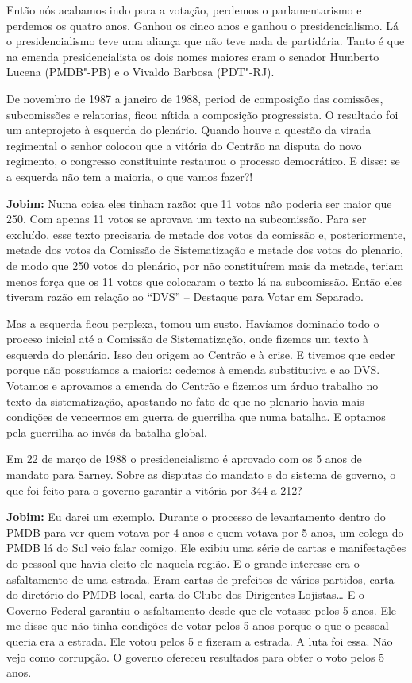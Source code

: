 Então nós acabamos indo para a votação, perdemos o parlamentarismo e
perdemos os quatro anos. Ganhou os cinco anos e ganhou o
presidencialismo. Lá o presidencialismo teve uma aliança que não teve
nada de partidária. Tanto é que na emenda presidencialista os dois nomes
maiores eram o senador Humberto Lucena (PMDB"-PB) e o Vivaldo Barbosa
(PDT"-RJ).

De novembro de 1987 a janeiro de 1988, period de composição das
comissões, subcomissões e relatorias, ficou nítida a composição
progressista. O resultado foi um anteprojeto à esquerda do plenário.
Quando houve a questão da virada regimental o senhor colocou que a
vitória do Centrão na disputa do novo regimento, o congresso
constituinte restaurou o processo democrático. E disse: se a esquerda
não tem a maioria, o que vamos fazer?!

\textbf{Jobim:} Numa coisa eles tinham razão: que 11 votos não poderia
ser maior que 250. Com apenas 11 votos se aprovava um texto na
subcomissão. Para ser excluído, esse texto precisaria de metade dos
votos da comissão e, posteriormente, metade dos votos da Comissão de
Sistematização e metade dos votos do plenario, de modo que 250 votos do
plenário, por não constituírem mais da metade, teriam menos força que os
11 votos que colocaram o texto lá na subcomissão. Então eles tiveram
razão em relação ao ``DVS'' -- Destaque para Votar em Separado.

Mas a esquerda ficou perplexa, tomou um susto. Havíamos dominado todo o
proceso inicial até a Comissão de Sistematização, onde fizemos um texto
à esquerda do plenário. Isso deu origem ao Centrão e à crise. E tivemos
que ceder porque não possuíamos a maioria: cedemos à emenda substitutiva
e ao DVS. Votamos e aprovamos a emenda do Centrão e fizemos um árduo
trabalho no texto da sistematização, apostando no fato de que no
plenario havia mais condições de vencermos em guerra de guerrilha que
numa batalha. E optamos pela guerrilha ao invés da batalha global.

Em 22 de março de 1988 o presidencialismo é aprovado com os 5 anos de
mandato para Sarney. Sobre as disputas do mandato e do sistema de
governo, o que foi feito para o governo garantir a vitória por 344 a
212?

\textbf{Jobim:} Eu darei um exemplo. Durante o processo de levantamento
dentro do PMDB para ver quem votava por 4 anos e quem votava por 5 anos,
um colega do PMDB lá do Sul veio falar comigo. Ele exibiu uma série de
cartas e manifestações do pessoal que havia eleito ele naquela região. E
o grande interesse era o asfaltamento de uma estrada. Eram cartas de
prefeitos de vários partidos, carta do diretório do PMDB local, carta do
Clube dos Dirigentes Lojistas\ldots{} E o Governo Federal garantiu o
asfaltamento desde que ele votasse pelos 5 anos. Ele me disse que não
tinha condições de votar pelos 5 anos porque o que o pessoal queria era
a estrada. Ele votou pelos 5 e fizeram a estrada. A luta foi essa. Não
vejo como corrupção. O governo ofereceu resultados para obter o voto
pelos 5 anos.

